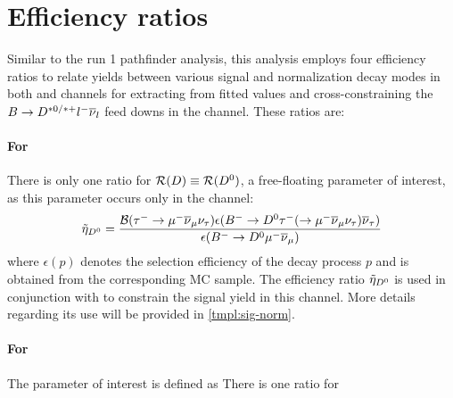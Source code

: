 \section{Efficiency ratios}
\label{ref:fit:eff}

Similar to the run 1 \RDX pathfinder analysis,
this analysis employs four efficiency ratios to relate yields between
various signal and normalization decay modes in both \Dz and \Dstar channels
for extracting \RDX from fitted values and cross-constraining the
$B \rightarrow D^{*0/*+}{l^-}{{\overline{\nu}}_l}$ feed downs in the \Dz channel.
These ratios are:

\paragraph{For \RD}
There is only one ratio for $\mathcal{R}(D) \equiv \mathcal{R}({{D}^0})$,
a free-floating parameter of interest,
as this parameter occurs only in the \Dz channel:
\begin{equation}
    \tilde{\eta}_{\Dz} = \frac{
        \mathcal{B}(\taum \rightarrow \mun\neumb\neut)
        \epsilon{(\Bm \rightarrow \Dz \taum (\rightarrow \mun\neumb\neut) \neutb)}
    }{
        \epsilon({\Bm \rightarrow \Dz \mun \neumb})
    }
\end{equation}
where $\epsilon(p)$ denotes the selection efficiency of the decay process $p$
and is obtained from the corresponding MC sample.
The efficiency ratio
$\tilde{\eta}_{{{D}^0}}$ is used in conjunction with \RD to constrain the signal
yield in this channel.
More details regarding its use will be provided in \cref{tmpl:sig-norm}.

\paragraph{For \RDst}
The parameter of interest \RDst is defined as
There is one ratio for
